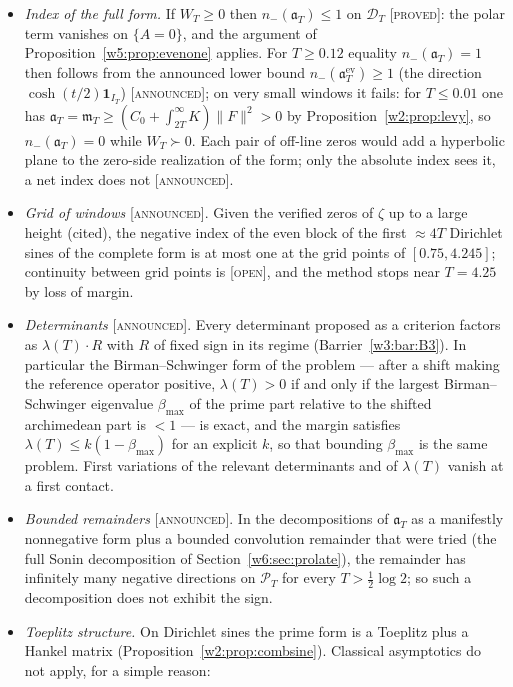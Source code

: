 \documentclass[11pt]{amsart}
\theoremstyle{definition}
\theoremstyle{remark}
\numberwithin{equation}{section}
\newcommand{\IT}{I_T}                                  %
\newcommand{\PT}{\mathcal{P}_T}                        %
\newcommand{\DT}{\mathcal{D}_T}                        %
\newcommand{\mT}{\mathfrak{m}_T}                       %
\newcommand{\aT}{\mathfrak{a}_T}                       %
\newcommand{\WT}{W_T}                                  %
\newcommand{\lam}{\lambda(T)}                          %
\newcommand{\stag}[1]{\textsc{[#1]}}
\newcommand{\PROVED}{\stag{proved}}
\newcommand{\OPENQ}{\stag{open}}
\newcommand{\ANNOUNCED}{\stag{announced}}
\begin{document}
\begin{itemize}
\item \emph{Index of the full form.} If $\WT\ge0$ then $n_-(\aT)\le1$ on $\DT$ \PROVED: the polar term vanishes on
$\{A=0\}$, and the argument of Proposition~\ref{w5:prop:evenone} applies. For $T\ge0.12$ equality $n_-(\aT)=1$ then
follows from the announced lower bound $n_-(\aT^{\mathrm{ev}})\ge1$ (the direction $\cosh(t/2)\mathbf 1_{\IT}$)
\ANNOUNCED; on very small windows it fails: for $T\le0.01$ one has $\aT=\mT\ge(C_0+\int_{2T}^\infty K)\|F\|^2>0$ by
Proposition~\ref{w2:prop:levy}, so $n_-(\aT)=0$ while $\WT\succ0$. Each pair of off-line zeros would add a
hyperbolic plane to the zero-side realization of the form; only the absolute index sees it, a net index does not
\ANNOUNCED.
\item \emph{Grid of windows} \ANNOUNCED. Given the verified zeros of $\zeta$ up to a large height (cited), the negative
index of the even block of the first $\approx4T$ Dirichlet sines of the complete form is at most one at the grid points
of $[0.75,4.245]$; continuity
between grid points is \OPENQ, and the method stops near $T=4.25$ by loss of margin.
\item \emph{Determinants} \ANNOUNCED. Every determinant proposed as a criterion factors as $\lam\cdot R$ with $R$ of fixed
sign in its regime (Barrier~\ref{w3:bar:B3}). In particular the Birman--Schwinger form of the problem --- after a shift
making the reference operator positive, $\lam>0$ if and only if the largest Birman--Schwinger eigenvalue $\beta_{\max}$
of the prime part relative to the shifted archimedean part is $<1$ --- is exact, and the margin satisfies
$\lam\le k(1-\beta_{\max})$ for an explicit $k$, so that bounding $\beta_{\max}$ is the same problem. First variations
of the relevant determinants and of $\lam$ vanish at a first contact.
\item \emph{Bounded remainders} \ANNOUNCED. In the decompositions of $\aT$ as a manifestly nonnegative form plus a bounded
convolution remainder that were tried (the full Sonin decomposition of Section~\ref{w6:sec:prolate}), the remainder has
infinitely many negative directions on $\PT$ for every $T>\frac12\log2$; so such a decomposition does not exhibit the
sign.
\item \emph{Toeplitz structure.} On Dirichlet sines the prime form is a Toeplitz plus a Hankel matrix
(Proposition~\ref{w2:prop:combsine}). Classical asymptotics do not apply, for a simple reason:
\end{itemize}
\end{document}
